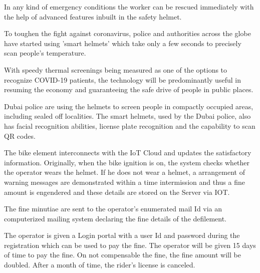 \documentclass[12pt,a4paper]{report}
\begin{document}
\noindent 
\newline
\noindent
\newline
{}

\noindent In any kind of emergency conditions the worker can be rescued  immediately with the help of advanced features inbuilt in the safety helmet.

\noindent 

\noindent 
\newline
\noindent
\newline
{}
\noindent To toughen the fight against coronavirus, police and authorities across the globe have started using 'smart helmets' which take only a few seconds to precisely scan people's temperature. 

\noindent With speedy thermal screenings being measured as one of the options to recognize COVID-19 patients, the technology will be predominantly useful in resuming the economy and guaranteeing the safe drive of people in public places.

\noindent  Dubai police are using the helmets to screen people in compactly occupied areas, including sealed off localities. The smart helmets, used by the Dubai police, also has facial recognition abilities, license plate recognition and the capability to scan QR codes.

\noindent 

\noindent 
\newline
\noindent
\newline
{}

\noindent The bike element interconnects with the IoT Cloud and updates the satisfactory information. Originally, when the bike ignition is on, the system checks whether the operator wears the helmet. If he does not wear a helmet, a arrangement of warning messages are demonstrated within a time intermission and thus a fine amount is engendered and these details are stored on the Server via IOT. 

\noindent The fine minutiae are sent to the operator's enumerated mail Id via an computerized mailing system declaring the fine details of the defilement.

\noindent The operator is given a Login portal with a user Id and password during the registration which can be used to pay the fine. The operator will be given 15 days of time to pay the fine. On not compensable the fine, the fine amount will be doubled. After a month of time, the rider's license is canceled.
\end{document}
